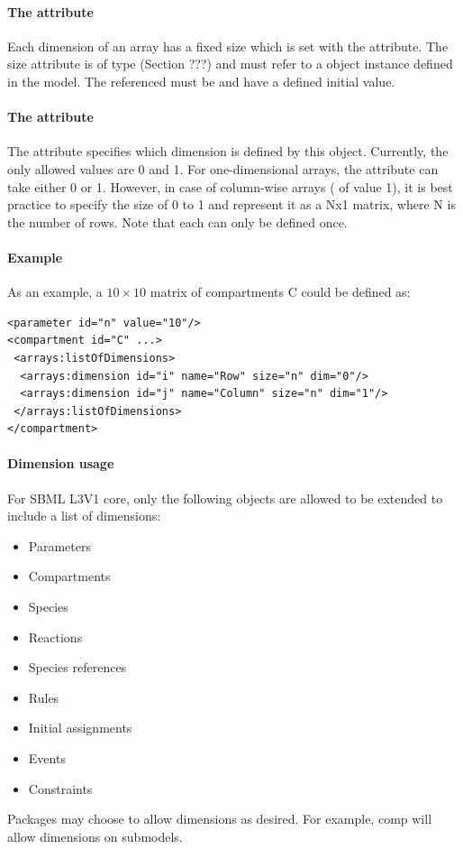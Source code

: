 \paragraph{The  attribute}

Each dimension of an array has a fixed size which is set with the  attribute.  The size attribute is of type  (Section ???) and must refer to a \Parameter object instance defined in the model.  The \Parameter referenced must be  and have a defined initial value.

\paragraph{The  attribute}

The  attribute specifies which dimension is defined by this \Dimension object.  Currently, the only allowed values are 0 and 1. For one-dimensional arrays, the  attribute can take either 0 or 1. However, in case of column-wise arrays ( of value 1), it is best practice to specify the size of   0 to 1 and represent it as a Nx1 matrix, where N is the number of rows. Note that each  can only be defined once.

\paragraph{Example}

As an example, a $10 \times 10$ matrix of compartments C could be defined as:
\begin{verbatim} 
<parameter id="n" value="10"/>
<compartment id="C" ...>
 <arrays:listOfDimensions>
  <arrays:dimension id="i" name="Row" size="n" dim="0"/>
  <arrays:dimension id="j" name="Column" size="n" dim="1"/>
 </arrays:listOfDimensions>
</compartment>
\end{verbatim}

\paragraph{Dimension usage}

For SBML L3V1 core, only the following objects are allowed to be extended to include a list of dimensions:
\begin{itemize}
\item Parameters
\item Compartments
\item Species
\item Reactions
\item Species references
\item Rules
\item Initial assignments
\item Events
\item Constraints
\end{itemize}
Packages may choose to allow dimensions as desired.  For example, comp will allow dimensions on submodels.  

